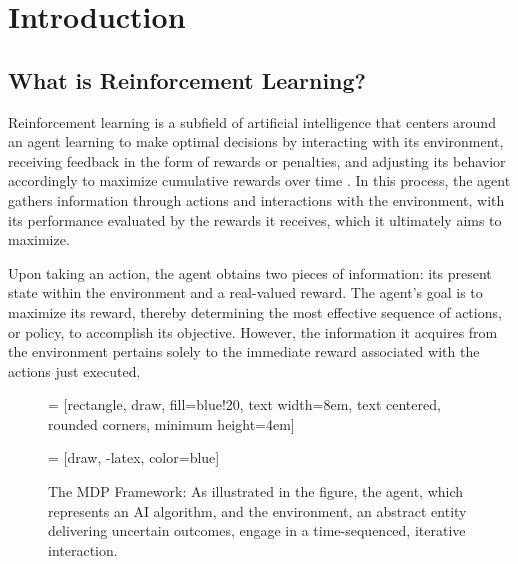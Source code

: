 \section{Introduction}
\subsection{What is Reinforcement Learning?}
Reinforcement learning is a subfield of artificial intelligence that centers around an agent learning to make optimal decisions by interacting with its environment, receiving feedback in the form of rewards or penalties, and adjusting its behavior accordingly to maximize cumulative rewards over time \cite{RL}. In this process, the agent gathers information through actions and interactions with the environment, with its performance evaluated by the rewards it receives, which it ultimately aims to maximize.

Upon taking an action, the agent obtains two pieces of information: its present state within the environment and a real-valued reward. The agent's goal is to maximize its reward, thereby determining the most effective sequence of actions, or policy, to accomplish its objective. However, the information it acquires from the environment pertains solely to the immediate reward associated with the actions just executed.
\begin{figure}
    \centering
     = [rectangle, draw, fill=blue!20,
    text width=8em, text centered, rounded corners, minimum height=4em]

     = [draw, -latex, color=blue]

    \caption{The MDP Framework: As illustrated in the figure, the agent, which represents an AI algorithm, and the environment, an abstract entity delivering uncertain outcomes, engage in a time-sequenced, iterative interaction.}
    \label{fig:my_label}
\end{figure}



